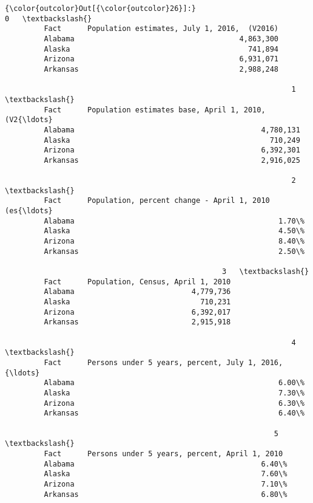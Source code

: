 \documentclass[11pt]{article}
\begin{document}
\begin{Verbatim}[commandchars=\\\{\}]
{\color{outcolor}Out[{\color{outcolor}26}]:}                                                     0   \textbackslash{}
         Fact      Population estimates, July 1, 2016,  (V2016)   
         Alabama                                      4,863,300   
         Alaska                                         741,894   
         Arizona                                      6,931,071   
         Arkansas                                     2,988,248   
         
                                                                  1   \textbackslash{}
         Fact      Population estimates base, April 1, 2010,  (V2{\ldots}   
         Alabama                                           4,780,131   
         Alaska                                              710,249   
         Arizona                                           6,392,301   
         Arkansas                                          2,916,025   
         
                                                                  2   \textbackslash{}
         Fact      Population, percent change - April 1, 2010 (es{\ldots}   
         Alabama                                               1.70\%   
         Alaska                                                4.50\%   
         Arizona                                               8.40\%   
         Arkansas                                              2.50\%   
         
                                                  3   \textbackslash{}
         Fact      Population, Census, April 1, 2010   
         Alabama                           4,779,736   
         Alaska                              710,231   
         Arizona                           6,392,017   
         Arkansas                          2,915,918   
         
                                                                  4   \textbackslash{}
         Fact      Persons under 5 years, percent, July 1, 2016, {\ldots}   
         Alabama                                               6.00\%   
         Alaska                                                7.30\%   
         Arizona                                               6.30\%   
         Arkansas                                              6.40\%   
         
                                                              5   \textbackslash{}
         Fact      Persons under 5 years, percent, April 1, 2010   
         Alabama                                           6.40\%   
         Alaska                                            7.60\%   
         Arizona                                           7.10\%   
         Arkansas                                          6.80\%   
         

\end{Verbatim}
\end{document}
